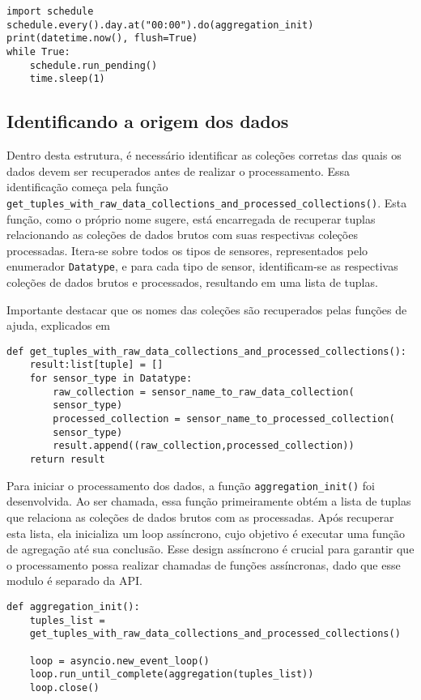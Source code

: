 \begin{verbatim}
import schedule
schedule.every().day.at("00:00").do(aggregation_init)
print(datetime.now(), flush=True)
while True:
    schedule.run_pending()
    time.sleep(1)
\end{verbatim}

\subsection{Identificando a origem dos dados}
Dentro desta estrutura, é necessário identificar as coleções corretas das quais os dados devem ser recuperados antes de realizar o processamento. Essa identificação começa pela função \texttt{get\_tuples\_with\_raw\_data\_collections\_and\_processed\_collections()}. Esta função, como o próprio nome sugere, está encarregada de recuperar tuplas relacionando as coleções de dados brutos com suas respectivas coleções processadas. Itera-se sobre todos os tipos de sensores, representados pelo enumerador \texttt{Datatype}, e para cada tipo de sensor, identificam-se as respectivas coleções de dados brutos e processados, resultando em uma lista de tuplas. 

Importante destacar que os nomes das coleções são recuperados pelas funções de ajuda, explicados em %

\begin{verbatim}
def get_tuples_with_raw_data_collections_and_processed_collections():
    result:list[tuple] = []
    for sensor_type in Datatype:
        raw_collection = sensor_name_to_raw_data_collection(
        sensor_type)
        processed_collection = sensor_name_to_processed_collection(
        sensor_type)
        result.append((raw_collection,processed_collection))
    return result
\end{verbatim}

Para iniciar o processamento dos dados, a função \texttt{aggregation\_init()} foi desenvolvida. Ao ser chamada, essa função primeiramente obtém a lista de tuplas que relaciona as coleções de dados brutos com as processadas. Após recuperar esta lista, ela inicializa um loop assíncrono, cujo objetivo é executar uma função de agregação até sua conclusão. Esse design assíncrono é crucial para garantir que o processamento possa realizar chamadas de funções assíncronas, dado que esse modulo é separado da API.

\begin{verbatim}
def aggregation_init():
    tuples_list = 
    get_tuples_with_raw_data_collections_and_processed_collections()

    loop = asyncio.new_event_loop()
    loop.run_until_complete(aggregation(tuples_list))
    loop.close()
\end{verbatim}

